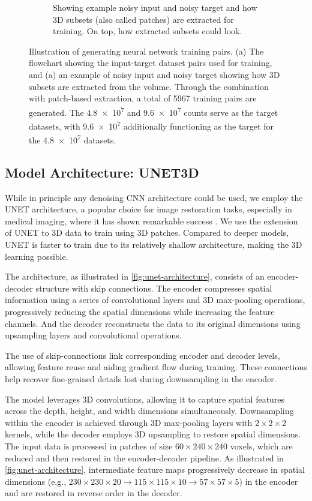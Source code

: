 \begin{figure}[h]
\begin{subfigure}[t]{0.39\linewidth}
        \caption{Showing example noisy input and noisy target and how 3D subsets (also called patches) are extracted for training. On top, how extracted subsets could look.}
        \label{fig:training-3d-patch-example}
    \end{subfigure}
    \caption{Illustration of generating neural network training pairs. (a) The flowchart showing the input-target dataset pairs used for training, and (a) an example of noisy input and noisy target showing how 3D subsets are extracted from the volume. Through the combination with patch-based extraction, a total of \num{5967} training pairs are generated. The \num{4.8e7} and \num{9.6e7} counts serve as the target datasets, with \num{9.6e7} additionally functioning as the target for the \num{4.8e7} datasets.}
\end{figure}

\subsection{Model Architecture: UNET3D}
While in principle any denoising \gls{CNN} architecture could be used, we employ the UNET architecture, a popular choice for image restoration tasks, especially in medical imaging, where it has shown remarkable success \cite{ronnebergerUNetConvolutionalNetworks}. We use the extension of UNET to 3D data \cite{cicek3DUNetLearning2016} to train using 3D patches. Compared to deeper models, UNET is faster to train due to its relatively shallow architecture, making the 3D learning possible. 

The architecture, as illustrated in \cref{fig:unet-architecture}, consists of an encoder-decoder structure with skip connections. The encoder compresses spatial information using a series of convolutional layers and 3D max-pooling operations, progressively reducing the spatial dimensions while increasing the feature channels. And the decoder reconstructs the data to its original dimensions using upsampling layers and convolutional operations.

The use of skip-connections link corresponding encoder and decoder levels, allowing feature reuse and aiding gradient flow during training. These connections help recover fine-grained details lost during downsampling in the encoder.

The model leverages 3D convolutions, allowing it to capture spatial features across the depth, height, and width dimensions simultaneously. Downsampling within the encoder is achieved through 3D max-pooling layers with $2 \times 2 \times 2$ kernels, while the decoder employs 3D upsampling to restore spatial dimensions. The input data is processed in patches of size $60 \times 240 \times 240$ voxels, which are reduced and then restored in the encoder-decoder pipeline. As illustrated in \cref{fig:unet-architecture}, intermediate feature maps progressively decrease in spatial dimensions (e.g., $230 \times 230 \times 20 \to 115 \times 115 \times 10 \to 57 \times 57 \times 5$) in the encoder and are restored in reverse order in the decoder. 

